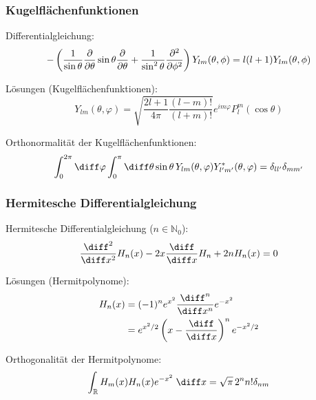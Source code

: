 \documentclass[11pt]{article}
\numberwithin{equation}{section}
\begin{document}
      \subsubsection{Kugelflächenfunktionen}
        Differentialgleichung:
        \begin{equation}
          -\left(
            \frac{1}{\sin\theta}\frac{\partial }{\partial \theta}\sin\theta\frac{\partial }{\partial \theta} + \frac{1}{\sin^2\theta}\frac{\partial^2}{\partial \phi^2}
          \right)
          Y_{lm}(\theta,\phi) = l(l+1)Y_{lm}(\theta,\phi)
        \end{equation}

        Lösungen (Kugelflächenfunktionen):
        \begin{equation} \label{eq:kugelflächenfunktionen}
          Y_{lm}(\theta,\varphi) = \sqrt{\frac{2l+1}{4\pi}\frac{(l-m)!}{(l+m)!}} e^{im\varphi} P_l^m(\cos\theta)
        \end{equation}

        Orthonormalität der Kugelflächenfunktionen:
        \begin{equation}
          \int_0^{2\pi}\diff\varphi \int_0^{\pi}\diff\theta \sin\theta\,  Y_{lm}(\theta,\varphi) Y^{*}_{l'm'}(\theta,\varphi) = \delta_{ll'}\delta_{mm'}
        \end{equation}

      \subsubsection{Hermitesche Differentialgleichung}
        Hermitesche Differentialgleichung ($n\in\mathbb{N}_0$):
        \begin{equation}
          \frac{\diff^2}{\diff x^2} H_n(x) -2x\tder{}{x} H_n+2 n H_n(x)=0
        \end{equation}

        Lösungen (Hermitpolynome):
        \begin{equation} \label{eq:Hermitpolynome}
          \begin{aligned}
            H_n(x) &= (-1)^n e^{x^2} \frac{\diff^n}{\diff x^n}e^{-x^2} \\
            &= e^{x^2/2}\left(x-\tder{}{x}\right)^n e^{-x^2/2} \\
          \end{aligned}
        \end{equation}

        Orthogonalität der Hermitpolynome:
        \begin{equation}
          \int_{\mathbb{R}} H_m(x) H_n(x) e^{-x^2}\;\diff x = \sqrt{\pi}\,2^n n!\delta_{nm}
        \end{equation}
\end{document}
